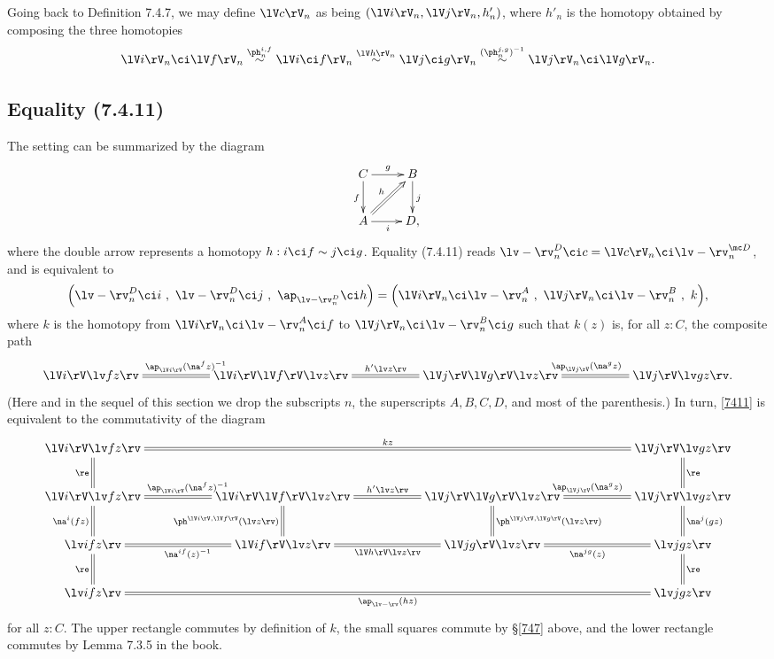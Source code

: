 \documentclass[12pt]{article}
\begin{document}
Going back to Definition 7.4.7, we may define $\lV c\rV_n$ as being $(\lV i\rV_n,\lV j\rV_n,h'_n)$, where $h'_n$ is the homotopy obtained by composing the three homotopies
$$
\lV i\rV_n\ci\lV f\rV_n\overset{\ph_n^{i,f}}{\sim}\lV i\ci f\rV_n\overset{\lV h\rV_n}{\sim}\lV j\ci g\rV_n\overset{(\ph_n^{j,g})^{-1}}{\sim}\lV j\rV_n\ci\lV g\rV_n.
$$


\subsection{Equality (7.4.11)}

The setting can be summarized by the diagram 
$$
\xymatrix{C\ar[r]^g\ar[d]_f&B\ar[d]^j\\ A\ar[r]_i\ar@{=>}[ur]^h&D,}
$$ 
where the double arrow represents a homotopy $h:i\ci f\sim j\ci g$. Equality (7.4.11) reads $\lv-\rv^D_n\ci c=\lV c\rV_n\ci\lv-\rv^{\mc D}_n$, and is equivalent to
\begin{equation}\label{7411}
\Big(\lv-\rv^D_n\ci i\ ,\ \lv-\rv^D_n\ci j\ ,\ \ap_{\lv-\rv^D_n}\ci h\Big)
=
\Big(\lV i\rV_n\ci\lv-\rv^A_n\ ,\ \lV j\rV_n\ci\lv-\rv^B_n\ ,\ k\Big),
\end{equation}
where $k$ is the homotopy from $\lV i\rV_n\ci\lv-\rv^A_n\ci f$ to $\lV j\rV_n\ci\lv-\rv^B_n\ci g$ such that $k(z)$ is, for all $z:C$, the composite path
$$
\xymatrix{
\lV i\rV\lv fz\rv&&
\lV i\rV\lV f\rV\lv z\rv\ar@{=}[ll]_{\ap_{\lV i\rV}(\na^fz)^{-1}}\ar@{=}[rr]^{h'\lv z\rv}&&
\lV j\rV\lV g\rV\lv z\rv\ar@{=}[rr]^{\ap_{\lV j\rV}(\na^gz)}&&
\lV j\rV\lv gz\rv.}
$$ 
(Here and in the sequel of this section we drop the subscripts $n$, the superscripts $A,B,C,D$, and most of the parenthesis.) In turn, \eqref{7411} is equivalent to the commutativity of the diagram %
$$ 
\xymatrix{
\lV i\rV\lv fz\rv\ar@{=}[d]_{\re}\ar@{=}[rrrrrr]^{kz}&&&&&&\lV j\rV\lv gz\rv\ar@{=}[d]^{\re}\\
\lV i\rV\lv fz\rv\ar@{=}[d]_{\na^i(fz)}&&
\lV i\rV\lV f\rV\lv z\rv\ar@{=}[ll]_{\ap_{\lV i\rV}(\na^fz)^{-1}}\ar@{=}[d]_{\ph^{\lV i\rV,\lV f\rV}(\lv z\rv)}\ar@{=}[rr]^{h'\lv z\rv}&&
\lV j\rV\lV g\rV\lv z\rv\ar@{=}[d]^{\ph^{\lV j\rV,\lV g\rV}(\lv z\rv)}\ar@{=}[rr]^{\ap_{\lV j\rV}(\na^gz)}&&
\lV j\rV\lv gz\rv\ar@{=}[d]^{\na^j(gz)}\\
%
\lv ifz\rv&&\lV if\rV\lv z\rv\ar@{=}[rr]_{\lV h\rV\lv z\rv}\ar@{=}[ll]^{\na^{if}(z)^{-1}}&&\lV jg\rV\lv z\rv\ar@{=}[rr]_{\na^{jg}(z)}&&\lv jgz\rv\\ 
\lv ifz\rv\ar@{=}[u]^{\re}\ar@{=}[rrrrrr]_{\ap_{\lv-\rv}(hz)}&&&&&&\lv jgz\rv\ar@{=}[u]_{\re}}
$$ 
for all $z:C$. The upper rectangle commutes by definition of $k$, the small squares commute by \S\ref{747} above, and the lower rectangle commutes by Lemma 7.3.5 in the book.
\end{document}
